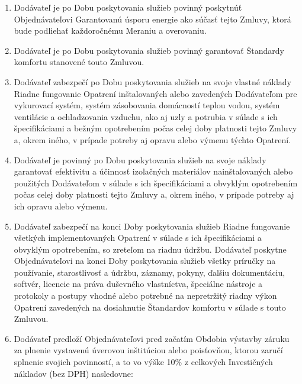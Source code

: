 \begin{multicols}{2}
\begin{enumerate}
\def\labelenumi{\arabic{enumi}.}
\item
  Dodávateľ je po Dobu poskytovania služieb povinný poskytnúť
  Objednávateľovi Garantovanú úsporu energie ako súčasť tejto Zmluvy,
  ktorá bude podliehať každoročnému Meraniu a overovaniu.
\item
  Dodávateľ je po Dobu poskytovania služieb povinný garantovať Štandardy
  komfortu stanovené touto Zmluvou.
\item
  Dodávateľ zabezpečí po Dobu poskytovania služieb na svoje vlastné
  náklady Riadne fungovanie Opatrení inštalovaných alebo zavedených
  Dodávateľom pre vykurovací systém, systém zásobovania domácností
  teplou vodou, systém ventilácie a ochladzovania vzduchu, ako aj uzly a
  potrubia v súlade s ich špecifikáciami a bežným opotrebením počas
  celej doby platnosti tejto Zmluvy a, okrem iného, v prípade potreby aj
  opravu alebo výmenu týchto Opatrení.
\item
  Dodávateľ je povinný po Dobu poskytovania služieb na svoje náklady
  garantovať efektivitu a účinnosť izolačných materiálov nainštalovaných
  alebo použitých Dodávateľom v súlade s ich špecifikáciami a obvyklým
  opotrebením počas celej doby platnosti tejto Zmluvy a, okrem iného, v
  prípade potreby aj ich opravu alebo výmenu.
\item
  Dodávateľ zabezpečí na konci Doby poskytovania služieb Riadne
  fungovanie všetkých implementovaných Opatrení v súlade s ich
  špecifikáciami a obvyklým opotrebením, so zreteľom na riadnu údržbu.
  Dodávateľ poskytne Objednávateľovi na konci Doby poskytovania služieb
  všetky príručky na používanie, starostlivosť a údržbu, záznamy,
  pokyny, ďalšiu dokumentáciu, softvér, licencie na práva duševného
  vlastníctva, špeciálne nástroje a protokoly a postupy vhodné alebo
  potrebné na nepretržitý riadny výkon Opatrení zavedených na
  dosiahnutie Štandardov komfortu v súlade s touto Zmluvou.
\item
  Dodávateľ predloží Objednávateľovi pred začatím Obdobia výstavby
  záruku za plnenie vystavenú úverovou inštitúciou alebo poisťovňou,
  ktorou zaručí splnenie svojich povinností, a to vo výške 10\% z
  celkových Investičných nákladov (bez DPH) nasledovne:


\end{enumerate}
\end{multicols}
